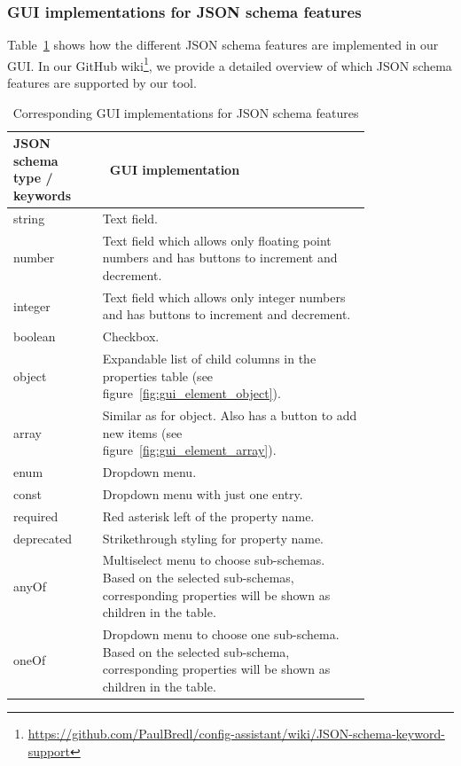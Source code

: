 \subsubsection{GUI implementations for JSON schema features} %
Table~\ref{table:json_schema_type_component} shows how the different JSON schema features are implemented in our GUI\@.
In our GitHub wiki\footnote{\url{https://github.com/PaulBredl/config-assistant/wiki/JSON-schema-keyword-support}}, we provide a detailed overview of which JSON schema features are supported by our tool.

\begin{table}[htb]
    \centering
    \caption{Corresponding GUI implementations for JSON schema features\label{table:json_schema_type_component}}
    \begin{tabular}{@{}p{0.2\linewidth}p{0.6\linewidth}@{}}
        \toprule
        \textbf{JSON schema type / keywords} & \textbf{\ GUI implementation} \\
        \midrule
        string & Text field. \\
        number & Text field which allows only floating point numbers and has buttons to increment and decrement. \\
        integer & Text field which allows only integer numbers and has buttons to increment and decrement. \\
        boolean & Checkbox.\\
        object & Expandable list of child columns in the properties table (see figure~\ref{fig:gui_element_object}). \\
        array & Similar as for object.
        Also has a button to add new items (see figure~\ref{fig:gui_element_array}).\\
        enum & Dropdown menu.\\
        const & Dropdown menu with just one entry.\\
        required & Red asterisk left of the property name.\\
        deprecated & Strikethrough styling for property name.\\
        anyOf & Multiselect menu to choose sub-schemas.
        Based on the selected sub-schemas, corresponding properties will be shown as children in the table.\\
        oneOf & Dropdown menu to choose one sub-schema.
        Based on the selected sub-schema, corresponding properties will be shown as children in the table.\\
        \bottomrule
    \end{tabular}
\end{table}

